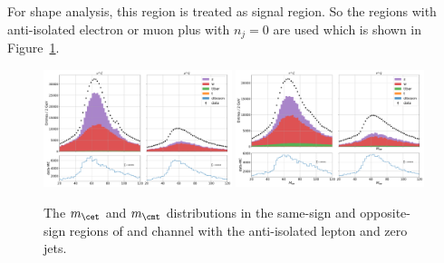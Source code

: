 For shape analysis, this region is treated as signal region. So the regions with anti-isolated electron or muon plus \PGth with $n_j=0$ are used which is shown in Figure~\ref{fig:background:ltau:mass_ltau_antiiso}.
\begin{figure}[h]
    \centering
    \includegraphics[width=0.49\textwidth]{chapters/Analysis/sectionBackground/figures/ltau_kinematics/mutau_cr.pdf}
    \includegraphics[width=0.49\textwidth]{chapters/Analysis/sectionBackground/figures/ltau_kinematics/etau_cr.pdf}
    \caption{The $m_{\cet}$ and $m_{\cmt}$ distributions in the same-sign and opposite-sign regions of \cet and \cmt channel with the anti-isolated lepton and zero jets.}
    \label{fig:background:ltau:mass_ltau_antiiso}
\end{figure}

